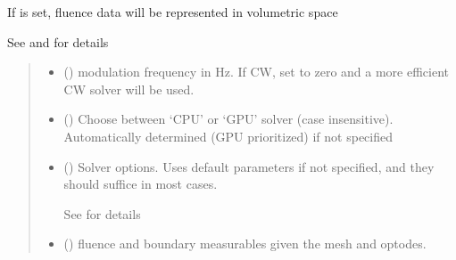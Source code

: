\documentclass[letterpaper,10pt,english]{sphinxmanual}
\begin{document}
\begin{fulllineitems}
\begin{fulllineitems}
\sphinxAtStartPar
If  is set, fluence data will be represented in volumetric space

\sphinxAtStartPar
See {\hyperref[\detokenize{_autosummary/nirfasterff.forward.femdata.femdata_stnd_CW:nirfasterff.forward.femdata.femdata_stnd_CW}]{}} and {\hyperref[\detokenize{_autosummary/nirfasterff.forward.femdata.femdata_stnd_FD:nirfasterff.forward.femdata.femdata_stnd_FD}]{}} for details
\begin{quote}\begin{description}
\begin{itemize}
\item {} 
\sphinxAtStartPar
{} () \textendash{} modulation frequency in Hz. If CW, set to zero and a more efficient CW solver will be used.

\item {} 
\sphinxAtStartPar
{} (\sphinxstyleliteralemphasis{\sphinxupquote{, }}) \textendash{} Choose between ‘CPU’ or ‘GPU’ solver (case insensitive). Automatically determined (GPU prioritized) if not specified

\item {} 
\sphinxAtStartPar
{} ({\hyperref[\detokenize{_autosummary/nirfasterff.utils.SolverOptions:nirfasterff.utils.SolverOptions}]{}}\sphinxstyleliteralemphasis{\sphinxupquote{, }}) \textendash{} 
\sphinxAtStartPar
Solver options. Uses default parameters if not specified, and they should suffice in most cases.

\sphinxAtStartPar
See {\hyperref[\detokenize{_autosummary/nirfasterff.utils.SolverOptions:nirfasterff.utils.SolverOptions}]{}} for details


\end{itemize}

\sphinxAtStartPar
\begin{itemize}
\item {} 
\sphinxAtStartPar
{} () \textendash{} fluence and boundary measurables given the mesh and optodes.


\end{itemize}
\end{description}
\end{quote}
\end{fulllineitems}
\end{fulllineitems}
\end{document}
